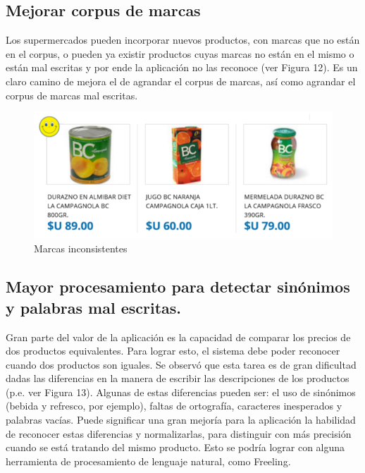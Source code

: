 \documentclass[12pt]{article} %
\begin{document}

\subsection{Mejorar corpus de marcas}
Los supermercados pueden incorporar nuevos productos, con marcas que no están en el corpus, o pueden ya existir productos cuyas marcas no están en el mismo o están mal escritas y por ende la aplicación no las reconoce (ver Figura 12). Es un claro camino de mejora el de agrandar el corpus de marcas, así como agrandar el corpus de marcas mal escritas.

\begin{figure}[H]
\includegraphics[scale=.8]{problema-marca}
\centering
\caption{Marcas inconsistentes}
\end{figure}


\subsection{Mayor procesamiento para detectar sinónimos y palabras mal escritas.}
Gran parte del valor de la aplicación es la capacidad de comparar los precios de dos productos equivalentes. Para lograr esto, el sistema debe poder reconocer cuando dos productos son iguales. Se observó que esta tarea es de gran dificultad dadas las diferencias en la manera de escribir las descripciones de los productos (p.e. ver Figura 13). Algunas de estas diferencias pueden ser: el uso de sinónimos (bebida y refresco, por ejemplo), faltas de ortografía, caracteres inesperados y palabras vacías. Puede significar una gran mejoría para la aplicación la habilidad de reconocer estas diferencias y normalizarlas, para distinguir con más precisión cuando se está tratando del mismo producto. Esto se podría lograr con alguna herramienta de procesamiento de lenguaje natural, como Freeling.
\end{document}
